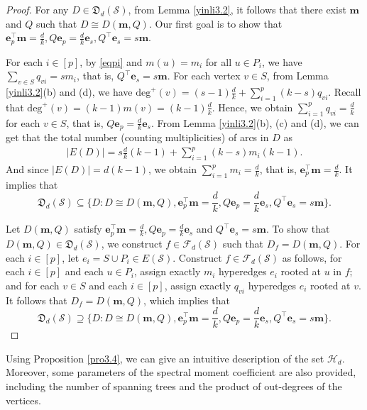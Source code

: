 \documentclass{article}
\begin{document}
\begin{proof}
For any $D \in \mathfrak{D}_d(\mathcal{S})$, from Lemma \ref{yinli3.2}, it follows that there exist
$\mathbf{m}$ and $Q$ such that $D \cong D(\mathbf{m},Q)$.
Our first goal is to show that $\mathbf{e}_p^\top\mathbf{m}=\frac{d}{k},Q\mathbf{e}_p=\frac{d}{k}\mathbf{e}_s,Q^{\top}\mathbf{e}_s=s\mathbf{m}$.

For each $i \in [p]$, by \eqref{eqpi} and $m(u)=m_{i}$ for all $u \in P_{i}$,
we have $\sum_{v\in S}q_{vi}=sm_{i}$, that is, $Q^{\top}\mathbf{e}_s=s\mathbf{m}$.
For each vertex $v \in S$, from Lemma \ref{yinli3.2}(b) and (d), we have
$\mathrm{deg}^+(v)=(s-1)\frac{d}{k}+\sum_{i=1}^{p}(k-s)q_{vi}$.
Recall that $\mathrm{deg}^+(v)=(k-1)m(v)=(k-1)\frac{d}{k}$.
Hence, we obtain $\sum_{i=1}^{p}q_{vi}=\frac{d}{k}$ for each $v \in S$, that is, $Q\mathbf{e}_p=\frac{d}{k}\mathbf{e}_s$.
From Lemma \ref{yinli3.2}(b), (c) and (d),
we can get that the total number (counting multiplicities) of arcs in $D$ as
\begin{align*}
|E(D)|=s\frac{d}{k}(k-1)+\sum_{i=1}^{p}(k-s)m_{i}(k-1).
\end{align*}
And since $|E(D)|=d(k-1)$,
we obtain $\sum_{i=1}^{p}m_{i}=\frac{d}{k}$,
that is, $\mathbf{e}_p^\top\mathbf{m}=\frac{d}{k}$.
It implies that
$$\mathfrak{D}_d(\mathcal{S}) \subseteq
    \{D: D \cong D(\mathbf{m},Q), \mathbf{e}_p^\top\mathbf{m}=\frac{d}{k},Q\mathbf{e}_p=\frac{d}{k}\mathbf{e}_s,Q^{\top}\mathbf{e}_s=s\mathbf{m}\}.$$

Let $D(\mathbf{m},Q)$ satisfy $\mathbf{e}_p^\top\mathbf{m}=\frac{d}{k},Q\mathbf{e}_p=\frac{d}{k}\mathbf{e}_s$ and $Q^{\top}\mathbf{e}_s=s\mathbf{m}$.
To show that $D(\mathbf{m},Q) \in \mathfrak{D}_d(\mathcal{S}) $,
we construct $f \in \mathcal{F}_{d}(\mathcal{S})$ such that $D_{f} = D(\mathbf{m},Q)$.
For each $i \in [p]$,
let $e_i =S \cup P_i \in E(\mathcal{S})$.
Construct $f \in \mathcal{F}_{d}(\mathcal{S})$ as follows, for each $i \in [p]$ and each $u \in P_i$, assign exactly $m_i$ hyperedges $e_i$ rooted at $u$ in $f$; and for each $v \in S$ and each $i \in [p]$, assign exactly $q_{vi}$ hyperedges $e_i$ rooted at $v$.
It follows that $D_{f} = D(\mathbf{m},Q)$, which implies that
$$\mathfrak{D}_d(\mathcal{S}) \supseteq
\{D: D \cong D(\mathbf{m},Q), \mathbf{e}_p^\top\mathbf{m}=\frac{d}{k},Q\mathbf{e}_p=\frac{d}{k}\mathbf{e}_s,Q^{\top}\mathbf{e}_s=s\mathbf{m}\}.$$
\end{proof}


Using Proposition \ref{pro3.4}, we can give an intuitive description of the set $\mathcal{H}_d$.
Moreover, some parameters of the spectral moment coefficient are also provided,
including the number of spanning trees and the product of out-degrees of the vertices.
\end{document}
